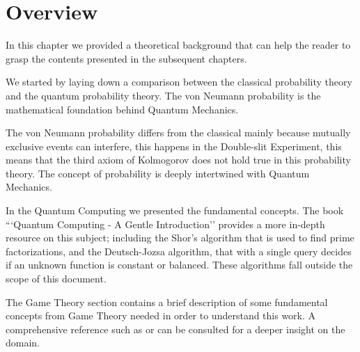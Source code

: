 \clearpage
\section{Overview}
\label{sec:background_overview}

In this chapter we provided a theoretical background that can help the reader to grasp the contents presented in the subsequent chapters.

We started by laying down a comparison between the classical probability theory and the quantum probability theory. The von Neumann probability is the mathematical foundation behind Quantum Mechanics. 

The von Neumann probability differs from the classical mainly because mutually exclusive events can interfere, this happens in the Double-slit Experiment, this means that the third axiom of Kolmogorov does not hold true in this probability theory. The concept of probability is deeply intertwined with Quantum Mechanics. 

In the Quantum Computing we presented the fundamental concepts. The book ```Quantum Computing - A Gentle Introduction''\cite{Rieffel2011} provides a more in-depth resource on this subject; including the Shor's algorithm that is used to find prime factorizations, and the Deutsch-Jozsa algorithm, that with a single query decides if an unknown function is constant or balanced. These algorithms fall outside the scope of this document.

The Game Theory section contains a brief description of some fundamental concepts from Game Theory needed in order to understand this work. A comprehensive reference such as \cite{Osborne2004} or \cite{Leyton-Brown2008:Essentials_Game_Theory} can be consulted for a deeper insight on the domain.


